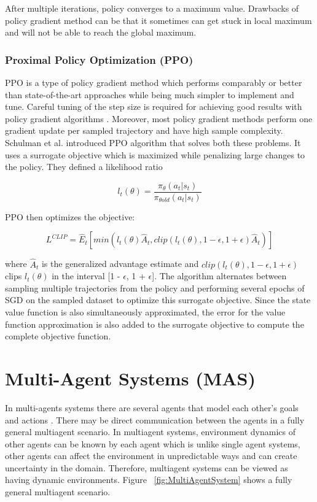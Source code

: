 \documentclass[12pt]{report}
\begin{document}
After multiple iterations, policy converges to a maximum value. Drawbacks of policy gradient method can be that it sometimes can get stuck in local maximum and will not be able to reach the global maximum.  

\subsubsection{Proximal Policy Optimization (PPO)} PPO is a type of policy gradient method which performs  comparably or better than state-of-the-art approaches while being much simpler to implement and tune. Careful tuning of the step size is required for achieving good results with policy gradient algorithms \cite{PPO}. Moreover, most policy gradient methods perform one gradient update per sampled trajectory and have high sample complexity. Schulman et al. \cite{Schulman} introduced PPO algorithm that solves both these problems. It uses a surrogate objective which is maximized while penalizing large changes to the policy. 
They defined a likelihood ratio 

\[ l_t(\theta) = \frac{\pi_\theta(a_t | s_t)}{\pi_{\theta old}(a_t | s_t)}\]

\hfill \break
PPO then optimizes the objective: 

\[ L^{CLIP} = \hat{E}_t [min(l_t(\theta) \hat{A}_t, clip(l_t (\theta) , 1- \epsilon , 1+\epsilon)\hat{A}_t)] \]

\hfill \break
where $\hat{A}_t$ is the generalized advantage estimate and $clip(l_t (\theta) , 1- \epsilon , 1+\epsilon)$ clips $l_t(\theta)$ in the interval [1 - $\epsilon$, 1 + $\epsilon$]. The algorithm alternates between sampling multiple trajectories from the policy and performing several epochs of SGD on the
sampled dataset to optimize this surrogate objective. Since the state value function is also simultaneously approximated, the error for the value function approximation is also added to the surrogate
objective to compute the complete objective function. 

\section{Multi-Agent Systems (MAS)}

In multi-agents systems there are several agents that model each other's goals and actions \cite{Stone}. There may be direct communication between the agents in a fully general multiagent scenario. In multiagent systems, environment dynamics of other agents can be known by each agent which is unlike single agent systems, other agents can affect the environment in unpredictable ways and can create uncertainty in the domain. Therefore, multiagent systems can be viewed as having dynamic environments. Figure ~\ref{fig:MultiAgentSystem} shows a fully general multiagent scenario. 
\end{document}
